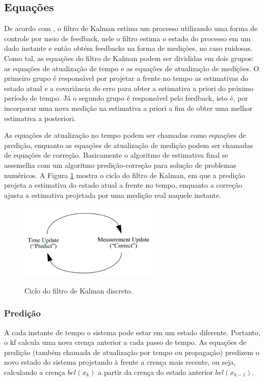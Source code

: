 \documentclass[acronym, symbols, table]{fei}
\begin{document}
		\subsection{Equações} \label{sec:filtro_de_kalman_equacoes}
			
			De acordo com \textcite{khodarahmi2023review}, o filtro de Kalman estima um processo utilizando uma forma de controle por meio de feedback, nele o filtro estima o estado do processo em um dado instante e então obtém feedbacks na forma de medições, no caso ruidosas. Como tal, as equações do filtro de Kalman podem ser divididas em dois grupos: as equações de atualização de tempo e as equações de atualização de medições. O primeiro grupo é responsável por projetar a frente no tempo as estimativas do estado atual e a covariância do erro para obter a estimativa a priori do próximo período de tempo. Já o segundo grupo é responsável pelo feedback, isto é, por incorporar uma nova medição na estimativa a priori a fim de obter uma melhor estimativa a posteriori.
			
			As equações de atualização no tempo podem ser chamadas como equações de predição, enquanto as equações de atualização de medição podem ser chamadas de equações de correção. Basicamente o algoritmo de estimativa final se assemelha com um algoritmo predição-correção para solução de problemas numéricos. A Figura \ref{fig:predicao_atualizacao_kalman} mostra o ciclo do filtro de Kalman, em que a predição projeta a estimativa do estado atual a frente no tempo, enquanto a correção ajusta a estimativa projetada por uma medição real naquele instante.
			
			\begin{figure}[!htb]
				\centering
				\caption{Ciclo do filtro de Kalman discreto.} 
				\includegraphics[width=0.6\textwidth]{predicao_atualizacao_kalman.png}
				\label{fig:predicao_atualizacao_kalman}
			\end{figure}
			
			\subsubsection{Predição}
				A cada instante de tempo o sistema pode estar em um estado diferente. Portanto, o \acrshort{kf} calcula uma nova crença anterior a cada passo de tempo. As equações de predição (também chamada de atualização por tempo ou propagação) predizem o novo estado do sistema projetando à frente a crença mais recente, ou seja, calculando a crença $bel(x_k)$ a partir da crença do estado anterior $bel(x_{k-1})$. 
				
\end{document}

